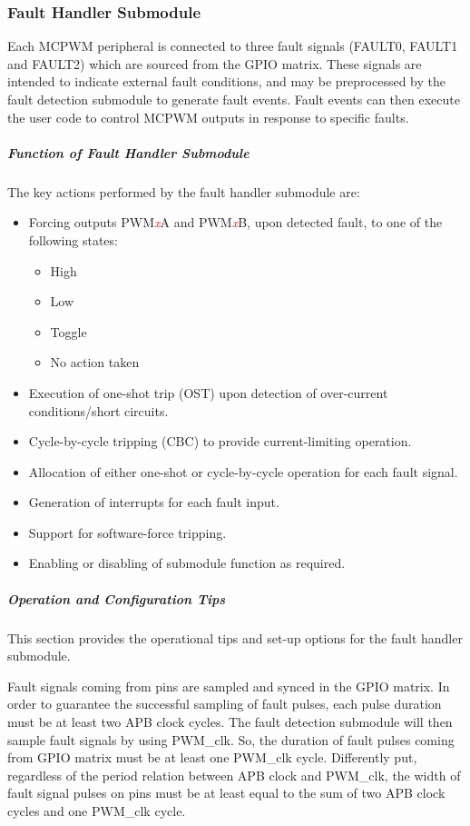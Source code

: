 \documentclass[main\_\_EN.tex]{subfiles}
\begin{document}
\subsubsection{Fault Handler Submodule}
Each MCPWM peripheral is connected to three fault signals (FAULT0, FAULT1 and FAULT2) which are sourced from the GPIO matrix. These signals are intended to indicate external fault conditions, and may be preprocessed by the fault detection submodule to generate fault events. Fault events can then execute the user code to control MCPWM outputs in response to specific faults.

\subparagraph{Function of Fault Handler Submodule}
The key actions performed by the fault handler submodule are:
\begin{itemize}
    \item Forcing outputs PWM\textcolor{red}{\it{x}}A and PWM\textcolor{red}{\it{x}}B, upon detected fault, to one of the following states:
    \begin{itemize}
        \item High
        \item Low
        \item Toggle
        \item No action taken
    \end{itemize}
    \item Execution of one-shot trip (OST) upon detection of over-current conditions/short circuits.
    \item Cycle-by-cycle tripping (CBC) to provide current-limiting operation.
    \item Allocation of either one-shot or cycle-by-cycle operation for each fault signal.
    \item Generation of interrupts for each fault input.
    \item Support for software-force tripping.
    \item Enabling or disabling of submodule function as required.
\end{itemize}

\subparagraph{Operation and Configuration Tips}
This section provides the operational tips and set-up options for the fault handler submodule.

Fault signals coming from pins are sampled and synced in the GPIO matrix. In order to guarantee the successful sampling of fault pulses, each pulse duration must be at least two APB clock cycles. The fault detection submodule will then sample fault signals by using PWM\_clk. So, the duration of fault pulses coming from GPIO matrix must be at least one PWM\_clk cycle. Differently put, regardless of the period relation between APB clock and PWM\_clk, the width of fault signal pulses on pins must be at least equal to the sum of two APB clock cycles and one PWM\_clk cycle.
\end{document}
